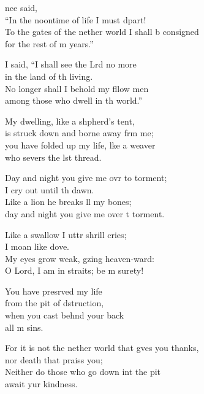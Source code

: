 \settowidth{\versewidth}{To the gates of the nether world I shall be consigned *}
\begin{psalmverse}%
  \begin{patverse}
    nce  said,\Med\\
“In the noontime of life I must dpart!\\
To the gates of the nether world I shall b consigned\Med\\
for the rest of m years.”

I said, “I shall see the Lrd no more\Med\\
in the land of th living.\\
No longer shall I behold my fllow men\Med\\
among those who dwell in th world.”

My dwelling, like a shpherd’s tent,\Med\\
is struck down and borne away frm me;\\
you have folded up my life, l\pointup{\i}ke a weaver\Med\\
who severs the lst thread.

Day and night you give me ovr to torment;\Med\\
I cry out until th dawn.\\
Like a lion he breaks ll my bones;\Med\\
day and night you give me over t torment.

Like a swallow I uttr shrill cries;\Med\\
I moan like  dove.\\
My eyes grow weak, gzing heaven-ward:\Med\\
O Lord, I am in straits; be m surety!

You have presrved my life\Med\\
from the pit of dstruction,\\
when you cast beh\pointup{\i}nd your back\Med\\
all m sins.

For it is not the nether world that g\pointup{\i}ves you thanks,\Med\\
nor death that praiss you;\\
Neither do those who go down int the pit\Med\\
await yur kindness.


\end{patverse}
\end{psalmverse}
